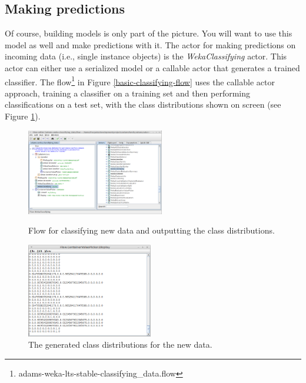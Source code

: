 \clearpage
\subsection{Making predictions}
Of course, building models is only part of the picture. You will want to use
this model as well and make predictions with it. The actor for making
predictions on incoming data (i.e., single instance objects) is the
\textit{WekaClassifying} actor. This actor can either use a serialized model or
a callable actor that generates a trained classifier. The
flow\footnote{adams-weka-lts-stable-classifying\_data.flow} in Figure
\ref{basic-classifying-flow} uses the callable actor approach, training a
classifier on a training set and then performing classifications on a test set,
with the class distributions shown on screen (see Figure
\ref{basic-classifying-output}).

\begin{figure}[ht]
  \begin{minipage}[t]{0.5\linewidth}
    \centering
    \includegraphics[width=6.0cm]{images/basic-classifying-flow.png}
    \caption{Flow for classifying new data and outputting the class
    distributions.}
    \label{basic-classifying-flow}
  \end{minipage}
  \hspace{0.5cm}
  \begin{minipage}[t]{0.5\linewidth}
    \centering
    \includegraphics[width=5.5cm]{images/basic-classifying-output.png}
    \caption{The generated class distributions for the new data.}
    \label{basic-classifying-output}
  \end{minipage}
\end{figure}

